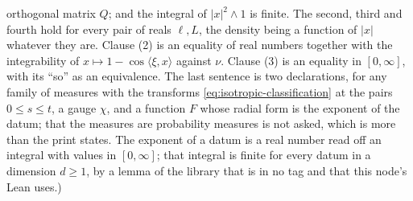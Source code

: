 \begin{lemma}
{orthogonal matrix $Q$; and the integral of $|x|^2 \wedge 1$ is finite. The second, third and
fourth hold for every pair of reals $\ell, L$, the density being a function of $|x|$ whatever
they are. Clause (2) is an equality of real numbers together with the integrability of
$x \mapsto 1 - \cos\langle\xi,x\rangle$ against $\nu$. Clause (3) is an equality in $[0,\infty]$,
with its ``so'' as an equivalence. The last sentence is two declarations, for any family of
measures with the transforms \ref{eq:isotropic-classification} at the pairs $0 \le s \le t$, a
gauge $\chi$, and a function $F$ whose radial form is the exponent of the datum; that the
measures are probability measures is not asked, which is more than the print states. The
exponent of a datum is a real number read off an integral with values in $[0,\infty]$; that
integral is finite for every datum in a dimension $d \ge 1$, by a lemma of the library that is
in no tag and that this node's Lean uses.)}
\end{lemma}

